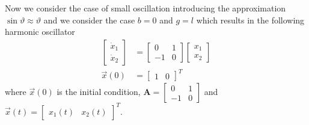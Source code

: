 \documentclass[12pt,a4paper,oneside]{book}
\begin{document}
\begin{onehalfspace}
Now we consider the case of small oscillation introducing the approximation 
$\sin\vartheta\approx\vartheta$ and we consider the case $b=0$ and $g=l$ which 
results in the following harmonic oscillator
\begin{equation}
	\begin{aligned}
		\begin{bmatrix} \dot{x}_1 \\ \dot{x}_2 \end{bmatrix} &= \begin{bmatrix} 
		0 & 1 \\ -1 & 0 \end{bmatrix} \begin{bmatrix} {x}_1 \\ {x}_2 
		\end{bmatrix} \\[6pt]
		\vec{x}(0) &= \begin{bmatrix} 1 & 0 \end{bmatrix}^T
	\end{aligned}
\end{equation}
where $\vec{x}(0)$ is the initial condition, $\mathbf{A} = \begin{bmatrix} 0 & 
1 \\ -1 & 0 \end{bmatrix}$ and $\vec{x}(t)= \begin{bmatrix} x_1(t) & x_2(t) 
\end{bmatrix}^T$.\\


\end{onehalfspace}
\end{document}
